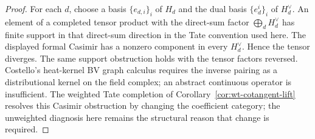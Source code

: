 \documentclass[11pt]{memoir}
\begin{document}
\begin{proof}
  For each $d$, choose a basis $\{e_{d,i}\}_i$ of $H_d$ and the dual basis
  $\{e^i_d\}_i$ of $H_d^\vee$. An element of a completed tensor product with
  the direct-sum factor $\bigoplus_d H_d^\vee$ has finite support in that
  direct-sum direction in the Tate convention used here. The displayed formal
  Casimir has a nonzero component in every $H_d^\vee$. Hence the tensor
  diverges. The same support obstruction holds with the tensor factors
  reversed. Costello's heat-kernel BV graph calculus requires the inverse
  pairing as a distributional kernel on the field complex; an abstract
  continuous operator is insufficient. The weighted Tate completion of
  Corollary~\ref{cor:wt-cotangent-lift} resolves this Casimir obstruction by
  changing the coefficient category; the unweighted diagnosis here remains
  the structural reason that change is required.
\end{proof}
\end{document}
